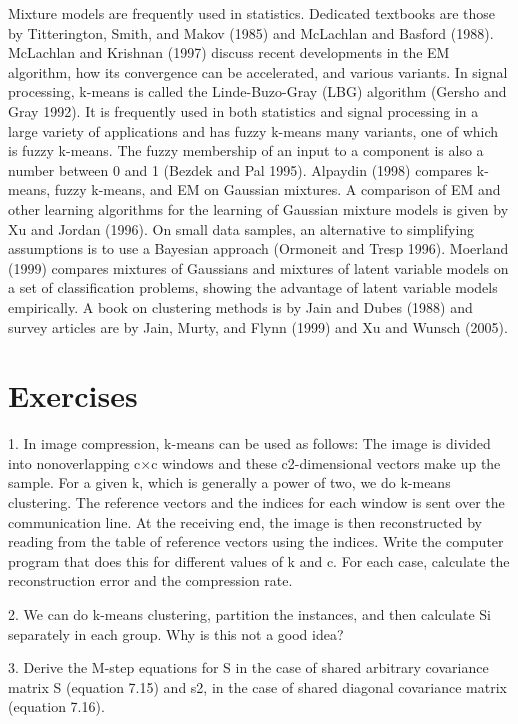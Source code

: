 Mixture models are frequently used in statistics. Dedicated textbooks are those by Titterington, Smith, and Makov (1985) and McLachlan and Basford (1988). McLachlan and Krishnan (1997) discuss recent developments in the EM algorithm, how its convergence can be accelerated, and various variants. In signal processing, k-means is called the Linde-Buzo-Gray (LBG) algorithm (Gersho and Gray 1992). It is frequently used in both statistics and signal processing in a large variety of applications and has fuzzy k-means many variants, one of which is fuzzy k-means. The fuzzy membership of an input to a component is also a number between 0 and 1 (Bezdek and Pal 1995). Alpaydin (1998) compares k-means, fuzzy k-means, and EM on Gaussian mixtures. A comparison of EM and other learning algorithms for the learning of Gaussian mixture models is given by Xu and Jordan (1996). On small data samples, an alternative to simplifying assumptions is to use a Bayesian approach (Ormoneit and Tresp 1996). Moerland (1999) compares mixtures of Gaussians and mixtures of latent variable models on a set of classification problems, showing the advantage of latent variable models empirically. A book on clustering methods is by Jain and Dubes (1988) and survey articles are by Jain, Murty, and Flynn (1999) and Xu and Wunsch (2005).

\section{Exercises}

1. In image compression, k-means can be used as follows: The image is divided into nonoverlapping c$\times$c windows and these c2-dimensional vectors make up the sample. For a given k, which is generally a power of two, we do k-means clustering. The reference vectors and the indices for each window is sent over the communication line. At the receiving end, the image is then reconstructed by reading from the table of reference vectors using the indices. Write the computer program that does this for different values of k and c. For each case, calculate the reconstruction error and the compression rate.

2. We can do k-means clustering, partition the instances, and then calculate Si separately in each group. Why is this not a good idea?

3. Derive the M-step equations for S in the case of shared arbitrary covariance matrix S (equation 7.15) and s2, in the case of shared diagonal covariance matrix (equation 7.16).

